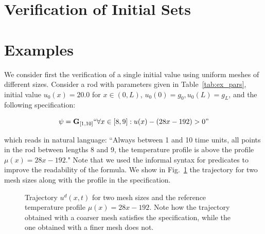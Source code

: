 \documentclass{article}
\newcommand{\Always}{\mathbf{G}}
\begin{document}
\section{Verification of Initial Sets}
\label{sec:verification_of_initial_sets}

\section{Examples}
\label{sec:examples}

We consider first the verification of a single initial value using uniform
meshes of different sizes. Consider a rod with parameters given in
Table~\ref{tab:ex_pars}, initial value $u_0(x) = 20.0$
for $x \in (0, L)$, $u_0(0) = g_0, u_0(L) = g_L$, and the following specification:

\begin{equation}
    \psi = \Always_{[1,10]} ``\forall x \in [8,9] : u(x) - (28x - 192) > 0"
\end{equation}

which reads in natural language: ``Always between 1 and 10 time units, all
points in the rod between lengths 8 and 9, the temperature profile is above the
profile $\mu(x) = 28x - 192$." Note that we used the informal syntax for
predicates to improve the readability of the formula. We show in
Fig.~\ref{fig:ex1_evolution} the trajectory for two mesh sizes along with the
profile in the specification.

\begin{figure}[!t]
    \centering 
        \hfill
        \hfill
    \caption{Trajectory $u^d(x, t)$ for two mesh sizes and the reference
        temperature profile $\mu(x) = 28x - 192$. Note how the trajectory
        obtained with a coarser mesh satisfies the specification, while the one
        obtained with a finer mesh does not.}
    \label{fig:ex1_evolution}
\end{figure}
\end{document}
